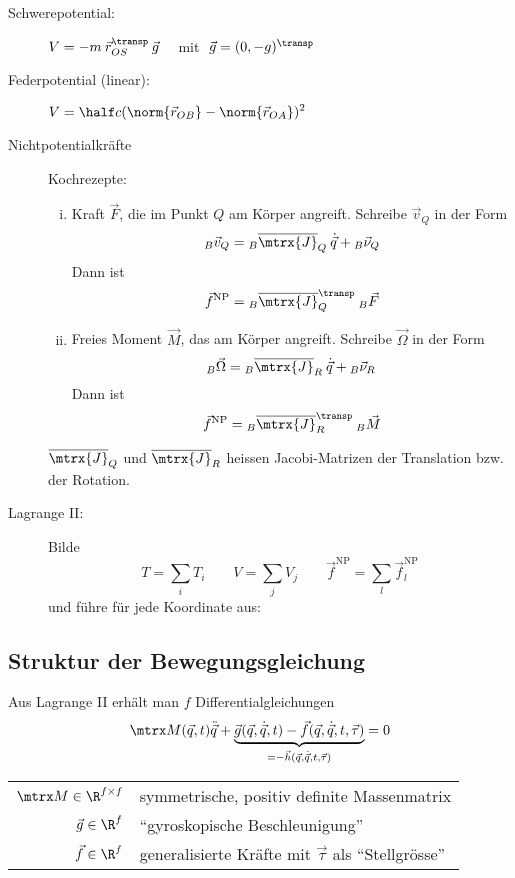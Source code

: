 		\begin{description}
			\item[Schwerepotential:] $\displaystyle V = -m \: \vec r_{OS}^\transp \: \vec g \quad$ mit $\ \vec g = (0,-g)^\transp$
			\item[Federpotential (linear):] $\displaystyle V = \half c (\norm{\vec r_{OB}} - \norm{\vec r_{OA}})^2$
			\item[Nichtpotentialkräfte] Kochrezepte:
				\begin{enumerate}[(i)]
					\item Kraft $\vec F$, die im Punkt $Q$ am Körper angreift. Schreibe $\vec v_Q$ in der Form
						\[
							{}_B \vec v_Q = {}_B \overline{\mtrx{J}}_Q \: \dot{\vec q} + {}_B \vec \nu_Q
						\]
						Dann ist
						\[
							\vec f^\text{NP} = {}_B \overline{\mtrx{J}}_Q^\transp \: {}_B \vec F
						\]
					
					\item Freies Moment $\vec M$, das am Körper angreift. Schreibe $\vec\Omega$ in der Form
						\[
							{}_B \vec\Omega = {}_B \overline{\mtrx{J}}_R \: \dot{\vec q} + {}_B \vec \nu_R
						\]
						Dann ist
						\[
							\vec f^\text{NP} = {}_B \overline{\mtrx{J}}_R^\transp \: {}_B \vec M
						\]
				\end{enumerate}
				
				$\overline{\mtrx{J}}_Q$ und $\overline{\mtrx{J}}_R$ heissen Jacobi-Matrizen der Translation bzw. der Rotation.
				
				\item[Lagrange II:] Bilde
					\[
						T = \sum_i T_i \qquad V = \sum_j V_j \qquad \vec f^\text{NP} = \sum_l \vec f^\text{NP}_l
					\]
					und führe für jede Koordinate aus:
		\end{description}
	
	\subsection{Struktur der Bewegungsgleichung} %
		Aus Lagrange II erhält man $f$ Differentialgleichungen
		\[
			\mtrx M(\vec q, t) \ddot{\vec q} + \underbrace{
				\vec g(\vec q, \dot{\vec q}, t) - \vec f(\vec q, \dot{\vec q}, t, \vec \tau)
			}_{= -\vec h(\vec q, \dot{\vec q}, t, \vec \tau)} = 0
		\]
		\begin{tabular}{r@{:\quad}l}
			$\mtrx M \in \R^{f \times f}$ & symmetrische, positiv definite Massenmatrix \\
			$\vec g \in \R^f$ & ``gyroskopische Beschleunigung'' \\
			$\vec f \in \R^f$ & generalisierte Kräfte mit $\vec \tau$ als ``Stellgrösse''
		\end{tabular}
		

